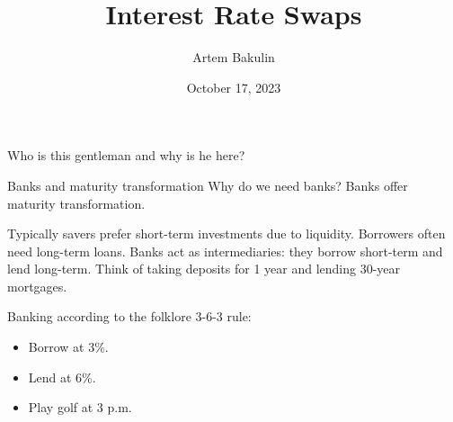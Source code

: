 \documentclass{beamer}
\title{Interest Rate Swaps}
\author{Artem Bakulin}
\date{October 17, 2023}
\begin{document}
\begin{frame}
\titlepage
\end{frame}



\begin{frame}{Who is this gentleman and why is he here?}
\centering
{}
\end{frame}



\begin{frame}{Banks and maturity transformation}
\justify
Why do we need banks? Banks offer \alert{maturity transformation}.

\justify
Typically savers prefer short-term investments due to liquidity.  Borrowers often need long-term loans. Banks act as intermediaries: they borrow short-term and lend long-term. Think of taking deposits for 1 year and lending 30-year mortgages.

\justify
Banking according to the folklore 3-6-3 rule:
\begin{itemize}
\item Borrow at 3\%.
\item Lend at 6\%.
\item Play golf at 3 p.m.
\end{itemize}
\end{frame}
\end{document}
